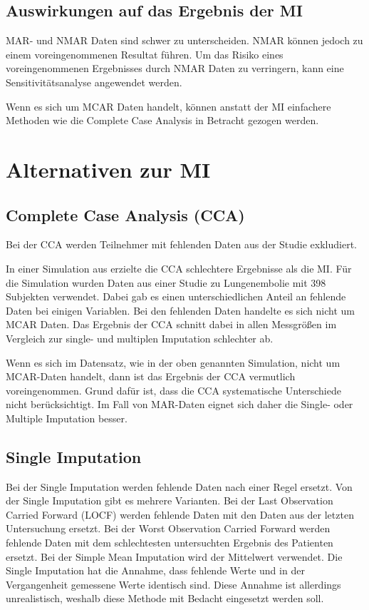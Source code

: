 \subsection{Auswirkungen auf das Ergebnis der MI}

MAR- und NMAR Daten sind schwer zu unterscheiden. NMAR können jedoch zu einem voreingenommenen Resultat führen. Um das 
Risiko eines voreingenommenen Ergebnisses durch NMAR Daten zu verringern, kann eine Sensitivitätsanalyse angewendet 
werden. \autocite[157]{Sterne2009} 

Wenn es sich um MCAR Daten handelt, können anstatt der MI einfachere Methoden wie die Complete Case Analysis in Betracht 
gezogen werden. \autocite*[1088]{Donders2006} 

\section{Alternativen zur MI}
\label{section:alternatives}

\subsection{Complete Case Analysis (CCA)}

Bei der CCA werden Teilnehmer mit fehlenden Daten aus der Studie exkludiert. \autocite[3]{Jakobsen2017} 

In einer Simulation aus \textcite[]{VanderHeijden2006} erzielte die CCA schlechtere Ergebnisse als die MI. Für 
die Simulation wurden Daten aus einer Studie zu Lungenembolie mit 398 Subjekten verwendet. Dabei gab es 
einen unterschiedlichen Anteil an fehlende Daten bei einigen Variablen. Bei den fehlenden Daten handelte es 
sich nicht um MCAR Daten.  Das Ergebnis der CCA schnitt dabei in allen Messgrößen im Vergleich zur single- 
und multiplen Imputation schlechter ab.

Wenn es sich im Datensatz, wie in der oben genannten Simulation, nicht um MCAR-Daten handelt, dann ist das Ergebnis der 
CCA vermutlich voreingenommen. Grund dafür ist, dass die CCA systematische Unterschiede nicht 
berücksichtigt. \autocite[157]{Sterne2009} Im Fall von MAR-Daten eignet sich daher die Single- oder Multiple 
Imputation besser. \autocite[1088]{Donders2006}


\subsection{Single Imputation}

Bei der Single Imputation werden fehlende Daten nach einer Regel ersetzt. Von der Single Imputation gibt es mehrere 
Varianten. Bei der Last Observation Carried Forward (LOCF) werden fehlende Daten mit den Daten aus der letzten 
Untersuchung ersetzt. Bei der Worst Observation Carried Forward werden fehlende Daten mit dem schlechtesten untersuchten 
Ergebnis des Patienten ersetzt. Bei der Simple Mean Imputation wird der Mittelwert verwendet. Die Single Imputation hat 
die Annahme, dass fehlende Werte und in der Vergangenheit gemessene Werte identisch sind. Diese Annahme ist allerdings 
unrealistisch, weshalb diese Methode mit Bedacht eingesetzt werden soll.
\autocite[3]{Jakobsen2017}

